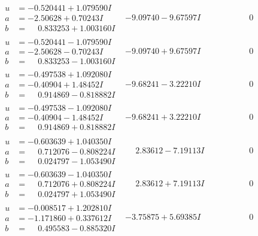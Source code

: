 \documentclass[1p]{elsarticle_modified}
\theoremstyle{definition}
\begin{document}
$$\begin{array}{c|c|c}
\begin{aligned}
u &= -0.520441 + 1.079590 I \\
a &= -2.50628 + 0.70243 I \\
b &= \phantom{-}0.833253 + 1.003160 I\end{aligned}
 & -9.09740 - 9.67597 I & \phantom{-0.000000 } 0 \\ \hline\begin{aligned}
u &= -0.520441 - 1.079590 I \\
a &= -2.50628 - 0.70243 I \\
b &= \phantom{-}0.833253 - 1.003160 I\end{aligned}
 & -9.09740 + 9.67597 I & \phantom{-0.000000 } 0 \\ \hline\begin{aligned}
u &= -0.497538 + 1.092080 I \\
a &= -0.40904 + 1.48452 I \\
b &= \phantom{-}0.914869 - 0.818882 I\end{aligned}
 & -9.68241 - 3.22210 I & \phantom{-0.000000 } 0 \\ \hline\begin{aligned}
u &= -0.497538 - 1.092080 I \\
a &= -0.40904 - 1.48452 I \\
b &= \phantom{-}0.914869 + 0.818882 I\end{aligned}
 & -9.68241 + 3.22210 I & \phantom{-0.000000 } 0 \\ \hline\begin{aligned}
u &= -0.603639 + 1.040350 I \\
a &= \phantom{-}0.712076 - 0.808224 I \\
b &= \phantom{-}0.024797 - 1.053490 I\end{aligned}
 & \phantom{-}2.83612 - 7.19113 I & \phantom{-0.000000 } 0 \\ \hline\begin{aligned}
u &= -0.603639 - 1.040350 I \\
a &= \phantom{-}0.712076 + 0.808224 I \\
b &= \phantom{-}0.024797 + 1.053490 I\end{aligned}
 & \phantom{-}2.83612 + 7.19113 I & \phantom{-0.000000 } 0 \\ \hline\begin{aligned}
u &= -0.008517 + 1.202810 I \\
a &= -1.171860 + 0.337612 I \\
b &= \phantom{-}0.495583 - 0.885320 I\end{aligned}
 & -3.75875 + 5.69385 I & \phantom{-0.000000 } 0 \\ \hline\begin{aligned}

\end{aligned}
\end{array}$$
\end{document}

